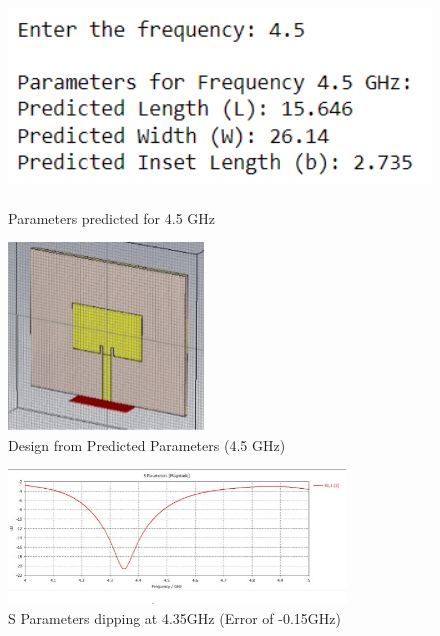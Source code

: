 \documentclass[a4paper,12pt]{report}
\begin{document}
\begin{figure}[H]
    \centering
    \begin{minipage}{0.48\textwidth}
        \centering
        \includegraphics[width=\textwidth,height =5cm]{data45.png}
        \caption{Parameters predicted for 4.5 GHz}
        \label{fig:4ghz_inset1}
    \end{minipage}
    \hfill %
    \begin{minipage}{0.48\textwidth}
        \centering
        \includegraphics[width=\textwidth,height =5cm]{pred45im.png}
        \caption{Design from Predicted Parameters (4.5 GHz)}
        \label{fig:4ghz_inset2}
    \end{minipage}
\end{figure}
\begin{figure}[H]
    \centering
    \includegraphics[width=0.8\textwidth]{pred45.jpg}
    \caption{S Parameters dipping at 4.35GHz (Error of -0.15GHz)}
    \label{fig:width_calculator}
\end{figure}
\end{document}
